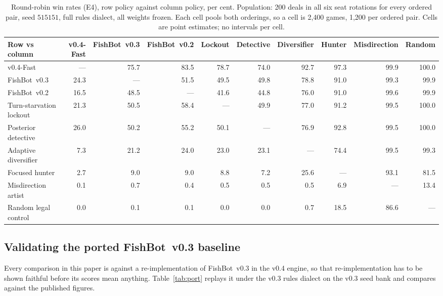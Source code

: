 \documentclass[11pt]{article}
\theoremstyle{definition}
\DeclareRobustCommand{\vfast}{\texorpdfstring{\mbox{v0.4-Fast}}{v0.4-Fast}}
\DeclareRobustCommand{\vthree}{\texorpdfstring{\mbox{FishBot v0.3}}{FishBot v0.3}}
\DeclareRobustCommand{\vtwo}{\texorpdfstring{\mbox{FishBot v0.2}}{FishBot v0.2}}
\newcommand{\numMatrixDeals}{200}
\newcommand{\numMatrixGamesPair}{1{,}200}
\newcommand{\numMatrixGamesCell}{2{,}400}
\begin{document}
\begin{table}[!htbp]
\centering
\caption{Round-robin win rates (E4), row policy against column policy, per cent.
Population: \numMatrixDeals{} deals in all six seat rotations for every ordered
pair, seed $515151$, full rules dialect, all weights frozen. Each cell pools both
orderings, so a cell is \numMatrixGamesCell{} games, \numMatrixGamesPair{} per
ordered pair. Cells are point estimates; no intervals per cell.}
\label{tab:matrix}
\scriptsize
\setlength{\tabcolsep}{3pt}
\begin{tabular}{lrrrrrrrrr}
\toprule
Row vs column & \vfast{} & \vthree{} & \vtwo{} & Lockout & Detective & Diversifier & Hunter & Misdirection & Random \\
\midrule
\vfast{} & --- & 75.7 & 83.5 & 78.7 & 74.0 & 92.7 & 97.3 & 99.9 & 100.0 \\
\vthree{} & 24.3 & --- & 51.5 & 49.5 & 49.8 & 78.8 & 91.0 & 99.3 & 99.9 \\
\vtwo{} & 16.5 & 48.5 & --- & 41.6 & 44.8 & 76.0 & 91.0 & 99.6 & 99.9 \\
Turn-starvation lockout & 21.3 & 50.5 & 58.4 & --- & 49.9 & 77.0 & 91.2 & 99.5 & 100.0 \\
Posterior detective & 26.0 & 50.2 & 55.2 & 50.1 & --- & 76.9 & 92.8 & 99.5 & 100.0 \\
Adaptive diversifier & 7.3 & 21.2 & 24.0 & 23.0 & 23.1 & --- & 74.4 & 99.5 & 99.3 \\
Focused hunter & 2.7 & 9.0 & 9.0 & 8.8 & 7.2 & 25.6 & --- & 93.1 & 81.5 \\
Misdirection artist & 0.1 & 0.7 & 0.4 & 0.5 & 0.5 & 0.5 & 6.9 & --- & 13.4 \\
Random legal control & 0.0 & 0.1 & 0.1 & 0.0 & 0.0 & 0.7 & 18.5 & 86.6 & --- \\
\bottomrule
\end{tabular}%
\end{table}


\subsection{Validating the ported \vthree{} baseline}
\label{app:port}

Every comparison in this paper is against a re-implementation of \vthree{} in the
v0.4 engine, so that re-implementation has to be shown faithful before its scores
mean anything. Table~\ref{tab:port} replays it under the v0.3 rules dialect on
the v0.3 seed bank and compares against the published figures.
\end{document}
